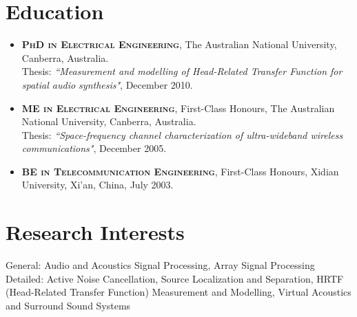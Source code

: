 \documentclass[10pt]{article}
\begin{document}
\section*{Education}
\begin{itemize}
\item \textsc{\textbf{PhD in Electrical Engineering}}, The Australian National University,
Canberra, Australia.\\
Thesis: \emph{``Measurement and modelling of Head-Related Transfer Function for spatial audio synthesis"}, December
2010.
\item \textsc{\textbf{ME in Electrical Engineering}}, First-Class Honours, The Australian National University, Canberra, Australia.\\
Thesis: \emph{``Space-frequency channel characterization of ultra-wideband wireless
communications"}, December 2005.
\item \textsc{\textbf{BE in Telecommunication Engineering}},
First-Class Honours, Xidian University, Xi'an, China, July 2003.
\end{itemize}

%
%

%


\section*{Research Interests}
General: Audio and Acoustics Signal Processing, Array Signal Processing \\
Detailed: Active Noise Cancellation, Source Localization and Separation, HRTF (Head-Related Transfer Function) Measurement and Modelling, Virtual Acoustics and Surround Sound Systems
\end{document}

